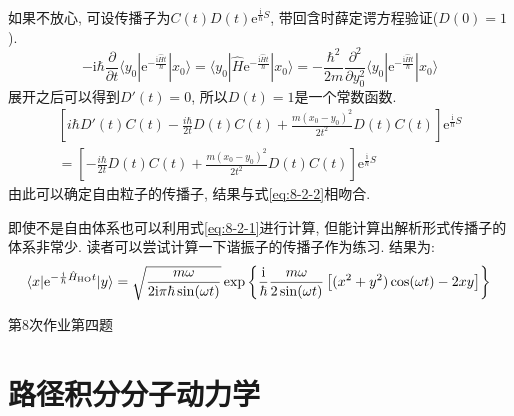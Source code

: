        如果不放心, 可设传播子为$ C(t) D(t) \mathrm{e}^{ \frac{\mathrm{i}}{\hbar} S } $, 带回含时薛定谔方程验证($D(0) = 1$).
        \begin{equation}
            -\mathrm{i}\hbar \frac {\partial}{\partial t} \langle y_0 | \mathrm{e}^{-\frac {\mathrm{i}\hat{H}t}{\hbar}} |x_0 \rangle =  \langle y_0 | \hat{H} \mathrm{e}^{-\frac {\mathrm{i}\hat{H}t}{\hbar}} |x_0 \rangle = -\frac {\hbar^2}{2m} \frac {\partial^2}{\partial y_0^2} \langle y_0 | \mathrm{e}^{-\frac {\mathrm{i}\hat{H}t}{\hbar}} |x_0 \rangle
        \end{equation}
        展开之后可以得到$D'(t) = 0$, 所以$D(t)=1$是一个常数函数. 
        \begin{equation}\begin{aligned}
            \left[i\hbar D'(t) C(t) - \frac{i\hbar}{2t} D(t) C(t) + \frac{m(x_0-y_0)^2}{2t^2} D(t) C(t) \right] \mathrm{e}^{\frac {\mathrm{i}}{\hbar} S} \\
            = \left[- \frac{i\hbar}{2t} D(t) C(t) + \frac{m(x_0-y_0)^2}{2t^2} D(t) C(t)\right] \mathrm{e}^{\frac {\mathrm{i}}{\hbar} S}
        \end{aligned}\end{equation}
        由此可以确定自由粒子的传播子, 结果与式\ref{eq:8-2-2}相吻合. 

        即使不是自由体系也可以利用式\ref{eq:8-2-1}进行计算, 但能计算出解析形式传播子的体系非常少. 读者可以尝试计算一下谐振子的传播子作为练习. 结果为:
        \begin{equation}
            \langle x | \mathrm{e}^{-\frac {\mathrm{i}}{\hbar}\hat{H}_\mathrm{HO}t} | y \rangle = \sqrt{\frac{m\omega}{2\mathrm{i}\pi\hbar\sin(\omega t)}} \exp\left\{ \frac{\mathrm{i}}{\hbar} \frac{m\omega}{2\sin(\omega t)}\left[ (x^2 + y^2)\cos(\omega t) - 2xy \right] \right\} \\
        \end{equation}

        \begin{asg}
            第8次作业第四题
        \end{asg}

    \section{路径积分分子动力学}


